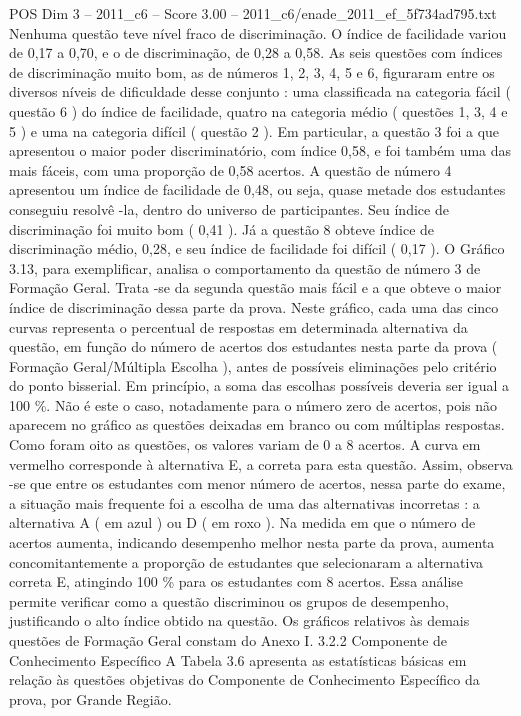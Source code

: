 \begin{textsample}{POS Dim 3 – 2011\_c6 – Score 3.00 – 2011\_c6/enade\_2011\_ef\_5f734ad795.txt}
Nenhuma questão teve nível fraco de discriminação.
O índice de facilidade variou de 0,17 a 0,70, e o de discriminação, de 0,28 a 0,58.
As seis questões com índices de discriminação muito bom, as de números 1, 2, 3, 4, 5 e 6, figuraram entre os diversos níveis de dificuldade desse conjunto : uma classificada na categoria fácil ( questão 6 ) do índice de facilidade, quatro na categoria médio ( questões 1, 3, 4 e 5 ) e uma na categoria difícil ( questão 2 ).
Em particular, a questão 3 foi a que apresentou o maior poder discriminatório, com índice 0,58, e foi também uma das mais fáceis, com uma proporção de 0,58 acertos.
A questão de número 4 apresentou um índice de facilidade de 0,48, ou seja, quase metade dos estudantes conseguiu resolvê -la, dentro do universo de participantes.
Seu índice de discriminação foi muito bom ( 0,41 ).
Já a questão 8 obteve índice de discriminação médio, 0,28, e seu índice de facilidade foi difícil ( 0,17 ).
O Gráfico 3.13, para exemplificar, analisa o comportamento da questão de número 3 de Formação Geral.
Trata -se da segunda questão mais fácil e a que obteve o maior índice de discriminação dessa parte da prova.
Neste gráfico, cada uma das cinco curvas representa o percentual de respostas em determinada alternativa da questão, em função do número de acertos dos estudantes nesta parte da prova ( Formação Geral/Múltipla Escolha ), antes de possíveis eliminações pelo critério do ponto bisserial.
Em princípio, a soma das escolhas possíveis deveria ser igual a 100 \%.
Não é este o caso, notadamente para o número zero de acertos, pois não aparecem no gráfico as questões deixadas em branco ou com múltiplas respostas.
Como foram oito as questões, os valores variam de 0 a 8 acertos.
A curva em vermelho corresponde à alternativa E, a correta para esta questão.
Assim, observa -se que entre os estudantes com menor número de acertos, nessa parte do exame, a situação mais frequente foi a escolha de uma das alternativas incorretas : a alternativa A ( em azul ) ou D ( em roxo ).
Na medida em que o número de acertos aumenta, indicando desempenho melhor nesta parte da prova, aumenta concomitantemente a proporção de estudantes que selecionaram a alternativa correta E, atingindo 100 \% para os estudantes com 8 acertos.
Essa análise permite verificar como a questão discriminou os grupos de desempenho, justificando o alto índice obtido na questão.
Os gráficos relativos às demais questões de Formação Geral constam do Anexo I. 3.2.2 Componente de Conhecimento Específico A Tabela 3.6 apresenta as estatísticas básicas em relação às questões objetivas do Componente de Conhecimento Específico da prova, por Grande Região.

\end{textsample}
